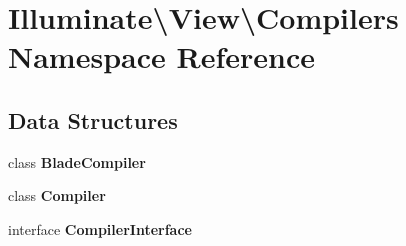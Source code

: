 \section{Illuminate\textbackslash{}View\textbackslash{}Compilers Namespace Reference}
\label{namespace_illuminate_1_1_view_1_1_compilers}
\subsection*{Data Structures}
\begin{DoxyCompactItemize}
\item 
class {\bf Blade\+Compiler}
\item 
class {\bf Compiler}
\item 
interface {\bf Compiler\+Interface}
\end{DoxyCompactItemize}

